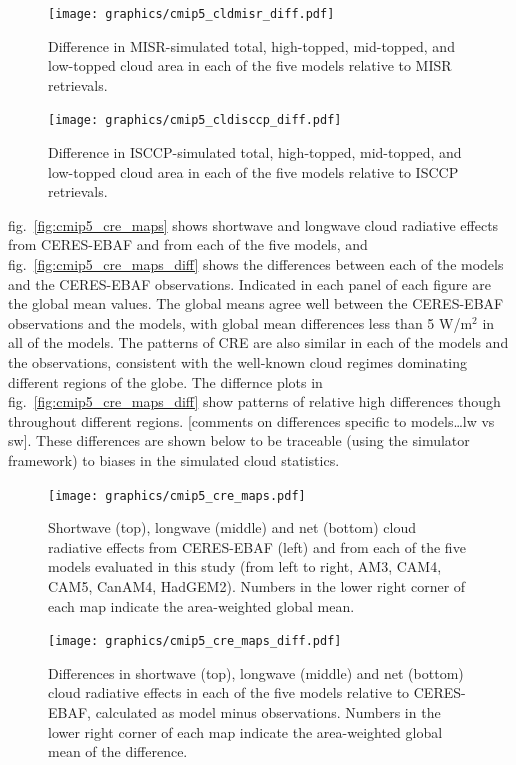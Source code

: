 \begin{figure}[htbp]
\centering
\texttt{[image: graphics/cmip5\_cldmisr\_diff.pdf]}
\caption{\label{fig:cmip5_cldmisr_maps_diff}Difference in MISR-simulated
total, high-topped, mid-topped, and low-topped cloud area in each of the
five models relative to MISR
retrievals.}\label{fig:cmip5ux5fcldmisrux5fmapsux5fdiff}
\end{figure}

\begin{figure}[htbp]
\centering
\texttt{[image: graphics/cmip5\_cldisccp\_diff.pdf]}
\caption{\label{fig:cmip5_cldisccp_maps_diff}Difference in
ISCCP-simulated total, high-topped, mid-topped, and low-topped cloud
area in each of the five models relative to ISCCP
retrievals.}\label{fig:cmip5ux5fcldisccpux5fmapsux5fdiff}
\end{figure}

fig.~\ref{fig:cmip5_cre_maps} shows shortwave and longwave cloud
radiative effects from CERES-EBAF and from each of the five models, and
fig.~\ref{fig:cmip5_cre_maps_diff} shows the differences between each of
the models and the CERES-EBAF observations. Indicated in each panel of
each figure are the global mean values. The global means agree well
between the CERES-EBAF observations and the models, with global mean
differences less than 5 W/m\(^2\) in all of the models. The patterns of
CRE are also similar in each of the models and the observations,
consistent with the well-known cloud regimes dominating different
regions of the globe. The differnce plots in
fig.~\ref{fig:cmip5_cre_maps_diff} show patterns of relative high
differences though throughout different regions. {[}comments on
differences specific to models\ldots{}lw vs sw{]}. These differences are
shown below to be traceable (using the simulator framework) to biases in
the simulated cloud statistics.

\begin{figure}[htbp]
\centering
\texttt{[image: graphics/cmip5\_cre\_maps.pdf]}
\caption{\label{fig:cmip5_cre_maps}Shortwave (top), longwave (middle)
and net (bottom) cloud radiative effects from CERES-EBAF (left) and from
each of the five models evaluated in this study (from left to right,
AM3, CAM4, CAM5, CanAM4, HadGEM2). Numbers in the lower right corner of
each map indicate the area-weighted global
mean.}\label{fig:cmip5ux5fcreux5fmaps}
\end{figure}

\begin{figure}[htbp]
\centering
\texttt{[image: graphics/cmip5\_cre\_maps\_diff.pdf]}
\caption{\label{fig:cmip5_cre_maps_diff}Differences in shortwave (top),
longwave (middle) and net (bottom) cloud radiative effects in each of
the five models relative to CERES-EBAF, calculated as model minus
observations. Numbers in the lower right corner of each map indicate the
area-weighted global mean of the
difference.}\label{fig:cmip5ux5fcreux5fmapsux5fdiff}
\end{figure}


